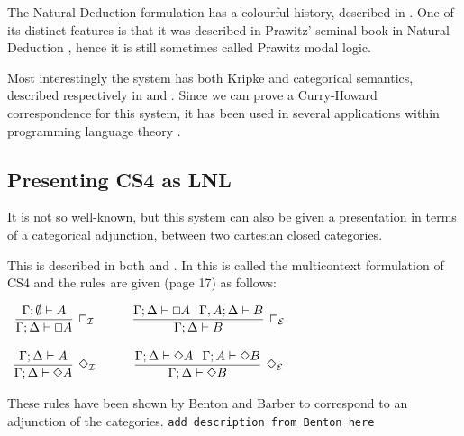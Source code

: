 \documentclass{article}
\renewcommand{\Box}{\oblong}
\begin{document}
The Natural Deduction formulation has a colourful history, described
in \cite{CS4}. One of its distinct features is that it was described
in Prawitz' seminal book in Natural Deduction \cite{prawitz1965},
hence it is still sometimes called Prawitz modal logic.

Most interestingly the system has both Kripke and categorical
semantics, described respectively in \cite{alechinaetal} and
\cite{CS4}. Since we can prove a Curry-Howard correspondence for this
system, it has been used in several applications within programming
language theory .

\subsection{Presenting CS4 as LNL}
It is not so well-known, but this system can also be given a
presentation in terms of a categorical adjunction, between two
cartesian closed categories.

This is described in both \cite{CS4} and \cite{icalp1998}. In
\cite{CS4} this is called the multicontext formulation of CS4 and the
rules are given (page 17) as follows:

\begin{center}
  \begin{math}
    \begin{array}{ccccc}              
      \infer[\Box_{\mathcal{I}}]{\Gamma; \Delta \vdash \Box A}{
        \Gamma;\emptyset \vdash  A
      }
      & \quad &
      \infer[\Box_{\mathcal{E}}]{\Gamma;\Delta \vdash B}{\Gamma; \Delta \vdash \Box A \hspace{.1in}
        \Gamma, A;\Delta \vdash B
      }\\\\
      \infer[\Diamond_{\mathcal{I}}]{\Gamma;\Delta \vdash \Diamond A}{
        \Gamma;\Delta \vdash A
      }
      & \quad &
      \infer[\Diamond_{\mathcal{E}}]{\Gamma;\Delta \vdash \Diamond B}{
        \Gamma ;\Delta \vdash \Diamond A \hspace{.1in}\Gamma; A\vdash \Diamond B
      }
    \end{array}        
  \end{math}
\end{center}

These rules have been shown by Benton \cite{benton1995} and Barber to
correspond to an adjunction of the categories.  {\tt add description
  from Benton here}
\end{document}
